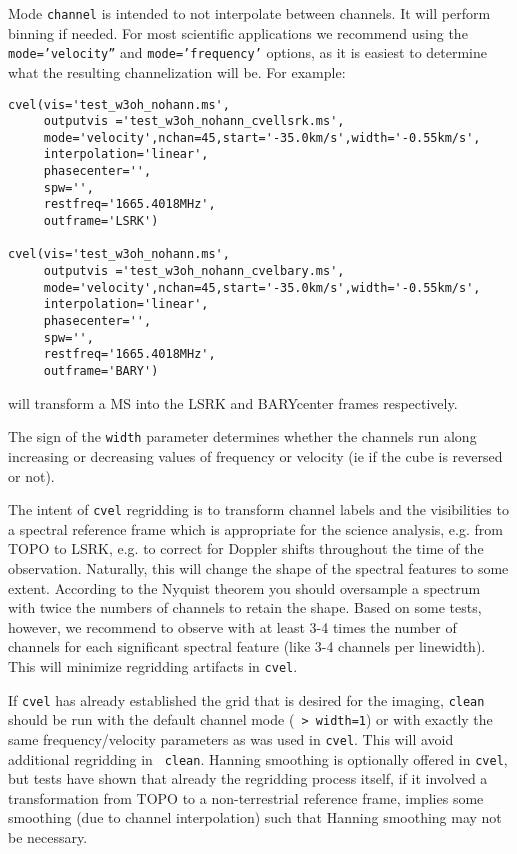 Mode {\tt channel} is intended to not interpolate between channels. It
will perform binning if needed.  For most scientific applications we
recommend using the {\tt mode='velocity''} and {\tt mode='frequency'}
options, as it is easiest to determine what the resulting
channelization will be. For example: \small
\begin{verbatim}
cvel(vis='test_w3oh_nohann.ms',
     outputvis ='test_w3oh_nohann_cvellsrk.ms',
     mode='velocity',nchan=45,start='-35.0km/s',width='-0.55km/s',
     interpolation='linear',
     phasecenter='',
     spw='',
     restfreq='1665.4018MHz',
     outframe='LSRK')

cvel(vis='test_w3oh_nohann.ms',
     outputvis ='test_w3oh_nohann_cvelbary.ms',
     mode='velocity',nchan=45,start='-35.0km/s',width='-0.55km/s',
     interpolation='linear',
     phasecenter='',
     spw='',
     restfreq='1665.4018MHz',
     outframe='BARY')

\end{verbatim}
\normalsize will transform a MS into the LSRK and BARYcenter frames
respectively.  

The sign of the {\tt width} parameter determines whether the channels
run along increasing or decreasing values of frequency or velocity (ie
if the cube is reversed or not). 



The intent of {\tt cvel} regridding is to transform channel labels and
the visibilities to a spectral reference frame which is appropriate
for the science analysis, e.g. from TOPO to LSRK, e.g. to correct for
Doppler shifts throughout the time of the observation. Naturally,
this will change the shape of the spectral features to some
extent. According to the Nyquist theorem you should oversample a
spectrum with twice the numbers of channels to retain the
shape. Based on some tests, however, we recommend to observe with at
least 3-4 times the number of channels for each significant spectral
feature (like 3-4 channels per linewidth). This will minimize
regridding artifacts in {\tt cvel}.  

If {\tt cvel} has already established the grid that is desired for the
imaging, {\tt clean} should be run with the default channel mode ({\tt
  > width=1}) or with exactly the same frequency/velocity parameters
as was used in {\tt cvel}. This will avoid additional regridding in {\tt
  clean}. Hanning smoothing is optionally offered in {\tt cvel}, but
tests have shown that already the regridding process itself, if it
involved a transformation from TOPO to a non-terrestrial reference
frame, implies some smoothing (due to channel interpolation) such that
Hanning smoothing may not be necessary.


